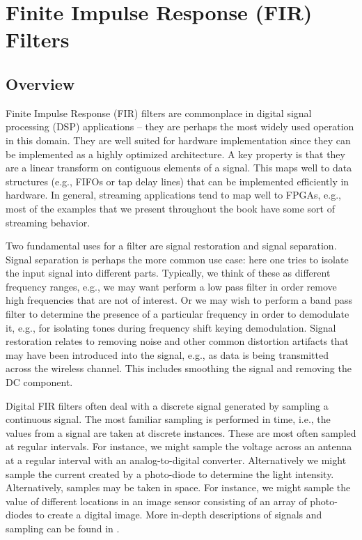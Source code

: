 
\chapter{Finite Impulse Response (FIR) Filters}
\glsresetall
\label{chapter:fir}

\section{Overview}
Finite Impulse Response (FIR) filters are commonplace in digital signal processing (DSP) applications -- they are perhaps the most widely used operation in this domain. They are well suited for hardware implementation since they can be implemented as a highly optimized architecture. A key property is that they are a linear transform on contiguous elements of a signal. This maps well to data structures (e.g., FIFOs or tap delay lines) that can be implemented efficiently in hardware. In general, streaming applications tend to map well to FPGAs, e.g., most of the examples that we present throughout the book have some sort of streaming behavior. 

Two fundamental uses for a filter are signal restoration and signal separation. Signal separation is perhaps the more common use case: here one tries to isolate the input signal into different parts. Typically, we think of these as different frequency ranges, e.g., we may want perform a low pass filter in order remove high frequencies that are not of interest. Or we may wish to perform a band pass filter to determine the presence of a particular frequency in order to demodulate it, e.g., for isolating tones during frequency shift keying demodulation.  Signal restoration relates to removing noise and other common distortion artifacts that may have been introduced into the signal, e.g., as data is being transmitted across the wireless channel. This includes smoothing the signal and removing the DC component.

Digital FIR filters often deal with a discrete signal generated by sampling a continuous signal. The most familiar sampling is performed in time, i.e., the values from a signal are taken at discrete instances. These are most often sampled at regular intervals. For instance, we might sample the voltage across an antenna at a regular interval with an analog-to-digital converter. Alternatively we might sample the current created by a photo-diode to determine the light intensity.  Alternatively, samples may be taken in space.  For instance, we might sample the value of different locations in an image sensor consisting of an array of photo-diodes to create a digital image.  More in-depth descriptions of signals and sampling can be found in \cite{lee2011signalsandsystems}.

